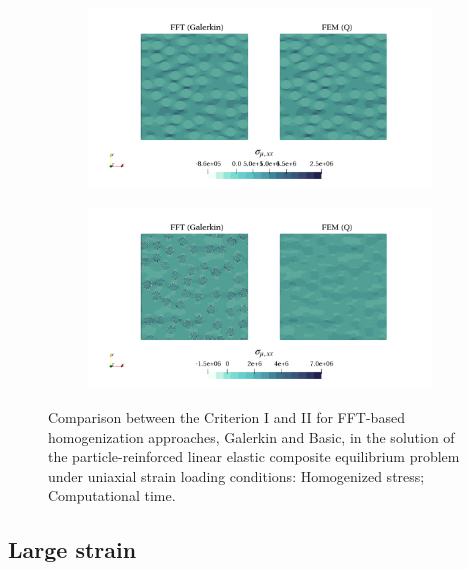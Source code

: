 \begin{figure}[hbt]
\centering
	\begin{subfigure}[b]{\textwidth}
    \centering
    \includegraphics[width=\textwidth]{figures/linear_2D_ratio_-4_normal_stress_11}
    \caption{}
    \label{subfig:linear_2D_ratio_4_normal_stress_11}
  \end{subfigure}
  \begin{subfigure}[b]{\textwidth}
    \centering
    \includegraphics[width=\textwidth]{figures/linear_2D_ratio_4_normal_stress_11}
    \caption{}
    \label{subfig:linear_2D_ratio_-4_normal_stress_11}
  \end{subfigure}
\caption{Comparison between the Criterion I and II for FFT-based homogenization approaches, Galerkin and Basic, in the
solution of the particle-reinforced linear elastic composite equilibrium problem under uniaxial
strain loading conditions:  Homogenized stress;  Computational time.}
\label{fig:linear_3D_normal_comparison_crit}
\end{figure}

\subsection{Large strain}

